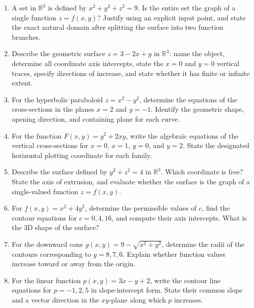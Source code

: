 \documentclass[11pt,letterpaper]{article}
\newcommand{\R}{\mathbb{R}}
\begin{document}
\begin{enumerate}[label=\textbf{Q\arabic*.},leftmargin=*]
    \item A set in $\R^3$ is defined by $x^2 + y^2 + z^2 = 9$. Is the entire set the graph of a single function $z = f(x,y)$? Justify using an explicit input point, and state the exact natural domain after splitting the surface into two function branches.
    
    \item Describe the geometric surface $z = 3 - 2x + y$ in $\R^3$: name the object, determine all coordinate axis intercepts, state the $x=0$ and $y=0$ vertical traces, specify directions of increase, and state whether it has finite or infinite extent.
    
    \item For the hyperbolic paraboloid $z = x^2 - y^2$, determine the equations of the cross-sections in the planes $x = 2$ and $y = -1$. Identify the geometric shape, opening direction, and containing plane for each curve.
    
    \item For the function $F(x,y) = y^2 + 2xy$, write the algebraic equations of the vertical cross-sections for $x = 0$, $x = 1$, $y = 0$, and $y = 2$. State the designated horizontal plotting coordinate for each family.
    
    \item Describe the surface defined by $y^2 + z^2 = 4$ in $\R^3$. Which coordinate is free? State the axis of extrusion, and evaluate whether the surface is the graph of a single-valued function $z = f(x,y)$.
    
    \item For $f(x,y) = x^2 + 4y^2$, determine the permissible values of $c$, find the contour equations for $c = 0, 4, 16$, and compute their axis intercepts. What is the 3D shape of the surface?
    
    \item For the downward cone $g(x,y) = 9 - \sqrt{x^2+y^2}$, determine the radii of the contours corresponding to $g = 8, 7, 6$. Explain whether function values increase toward or away from the origin.
    
    \item For the linear function $p(x,y) = 3x - y + 2$, write the contour line equations for $p = -1, 2, 5$ in slope-intercept form. State their common slope and a vector direction in the $xy$-plane along which $p$ increases.
    

\end{enumerate}
\end{document}
